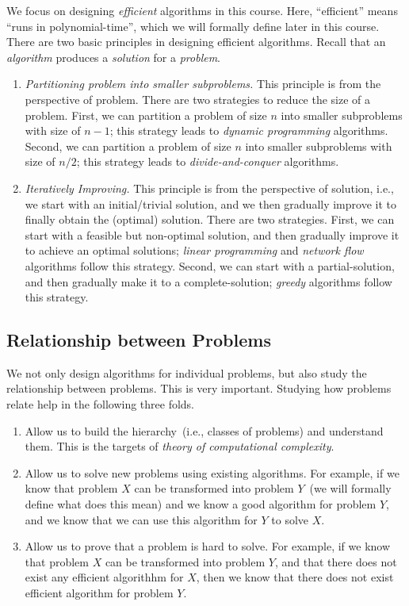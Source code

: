 We focus on designing \emph{efficient} algorithms in this course. Here,
``efficient'' means ``runs in polynomial-time'', which we will formally define later in this course.
There are two basic principles in designing efficient algorithms.
Recall that an \emph{algorithm} produces a \emph{solution} for a \emph{problem}.
\vspace*{-\topsep}
\begin{enumerate}
\item \emph{Partitioning problem into smaller subproblems.} This principle is from the perspective of problem.
There are two strategies to reduce the size of a problem. 
First, we can partition a problem of size $n$ into smaller subproblems with size of $n - 1$; this strategy leads to \emph{dynamic programming} algorithms.
Second, we can partition a problem of size $n$ into smaller subproblems with size of $n/2$; this strategy leads to \emph{divide-and-conquer} algorithms.
\item \emph{Iteratively Improving.} This principle is from the perspective of solution, i.e., we start with an initial/trivial solution,
and we then gradually improve it to finally obtain the (optimal) solution.
There are two strategies. First, we can start with a feasible but non-optimal solution, and then gradually improve it to achieve an optimal solutions;
\emph{linear programming} and \emph{network flow} algorithms follow this strategy.
Second, we can start with a partial-solution, and then gradually make it to a complete-solution;
\emph{greedy } algorithms follow this strategy.
\end{enumerate}

\subsection*{Relationship between Problems}

We not only design algorithms for individual problems, but also study the relationship between problems.
This is very important. Studying how problems relate help in the following three folds.
\vspace*{-\topsep}
\begin{enumerate}
\item Allow us to build the hierarchy~(i.e., classes of problems) and understand them. This is the targets of \emph{theory of computational complexity}.
\item Allow us to solve new problems using existing algorithms. For example, if we know that problem $X$ can be transformed into problem $Y$~(we will formally define what does this mean)
	and we know a good algorithm for problem $Y$, and we know that we can use this algorithm for $Y$ to solve $X$.
\item Allow us to prove that a problem is hard to solve. For example, if we know that problem $X$ can be transformed into problem $Y$, and that there does not exist
any efficient algorithhm for $X$, then we know that there does not exist efficient algorithm for problem $Y$.
\end{enumerate}

